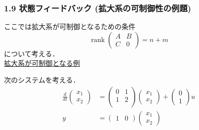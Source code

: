 \documentclass[10pt]{beamer}
\begin{document}
\begin{frame}[t]
\frametitle{1.9 状態フィードバック (拡大系の可制御性の例題)}
ここでは拡大系が可制御となるための条件
\begin{equation}
   \operatorname{rank} \left(\begin{array}{cc}
          A & B \\
    C & 0
         \end{array}\right)
   = n + m
\end{equation}
について考える．\\

\noindent
\underline{拡大系が可制御となる例}

次のシステムを考える．
\begin{align}
 \frac{d}{dt}
 \left(
 \begin{array}{c}
  x_1 \\
  x_2
 \end{array}
 \right) &=
 \left(
 \begin{array}{cc}
  0 & 1 \\
  1 & 2 \\
 \end{array}
 \right)
 \left(
 \begin{array}{c}
  x_1 \\
  x_2
 \end{array}
 \right) +
 \left(
 \begin{array}{c}
  0 \\
  1
 \end{array}
 \right) u \\
 y &=
 \left(
 \begin{array}{cc}
  1 & 0
 \end{array}
 \right)
 \left(
 \begin{array}{c}
  x_1 \\
  x_2
 \end{array}
 \right)
\end{align}
\end{frame}
\end{document}
